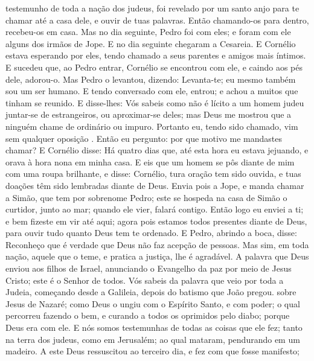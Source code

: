 {{} testemunho de toda a nação dos judeus, foi revelado por um santo anjo para te chamar até a casa dele, e ouvir de tuas palavras.
  Então chamando-os para dentro, recebeu-os em casa. Mas no dia seguinte, Pedro foi com eles; e foram com ele alguns dos irmãos de Jope.
  E no dia seguinte chegaram a Cesareia. E Cornélio estava esperando por eles, tendo chamado a seus parentes e amigos mais íntimos.
  E sucedeu que, ao Pedro entrar, Cornélio se encontrou com ele, e caindo aos pés dele, adorou-o.
  Mas Pedro o levantou, dizendo: Levanta-te; eu mesmo também sou um ser humano.
  E tendo conversado com ele, entrou; e achou a muitos que
{} tinham se reunido.
  E disse-lhes: Vós sabeis como não é lícito a um homem judeu juntar-se de estrangeiros, ou aproximar-se deles; mas Deus me mostrou que a ninguém chame de ordinário ou impuro.
  Portanto eu, tendo sido chamado, vim sem qualquer oposição
{} . Então eu pergunto: por que motivo me mandastes chamar?
  E Cornélio disse: Há quatro dias que, até esta hora eu estava jejuando, e orava à hora nona em minha casa.
  E eis que um homem se pôs diante de mim com uma roupa brilhante, e disse: Cornélio, tura oração tem sido ouvida, e tuas doações têm sido lembradas diante de Deus.
  Envia pois a Jope, e manda chamar a Simão, que tem por sobrenome Pedro; este se hospeda na casa de Simão o curtidor, junto ao mar; quando ele vier, falará contigo.
  Então logo eu enviei a ti; e bem fizeste em vir até aqui; agora pois estamos todos
{} presentes diante de Deus, para ouvir tudo quanto Deus tem te ordenado.
  E Pedro, abrindo a boca, disse: Reconheço que é verdade que Deus não faz acepção de pessoas.
  Mas sim, em toda nação, aquele que o teme, e pratica a justiça,
{} lhe é agradável.
  A palavra que Deus enviou aos filhos de Israel, anunciando o Evangelho da paz por meio de Jesus Cristo; este é o Senhor de todos.
  Vós sabeis da palavra que veio por toda a Judeia, começando desde a Galileia, depois do batismo que João pregou.
   sobre Jesus de Nazaré; como Deus o ungiu com o Espírito Santo, e com poder; o qual percorreu
{} fazendo o bem, e curando a todos os oprimidos pelo diabo; porque Deus era com ele.
  E nós somos testemunhas de todas as coisas que ele fez; tanto na terra dos judeus, como em Jerusalém; ao qual mataram, pendurando
{} em um madeiro.
  A este Deus ressuscitou ao terceiro dia, e fez com que fosse manifesto;
}
